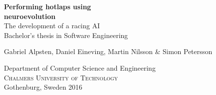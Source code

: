 \begin{titlepage}
			
\addtolength{\voffset}{2cm}

\begin{figure}[H]
\centering
\vspace{1cm}	%
\end{figure}
\setlength{\parindent}{0ex}
\mbox{}
\vfill
\renewcommand{\familydefault}{\sfdefault} \normalfont %


\textbf{{\Huge Performing hotlaps using \\ neuroevolution}} 	\\[0.5cm]
{\Large The development of a racing AI}\\[0.5cm]
Bachelor's thesis in Software Engineering \setlength{\parskip}{1cm}

{\large Gabriel Alpsten, Daniel Eineving, Martin Nilsson \& Simon Petersson} \setlength{\parskip}{2.9cm}

Department of Computer Science and Engineering \\
\textsc{Chalmers University of Technology} \\
Gothenburg, Sweden 2016

\renewcommand{\familydefault}{\rmdefault} \normalfont %
\end{titlepage}


\newpage
\restoregeometry
\thispagestyle{empty}
\mbox{}


